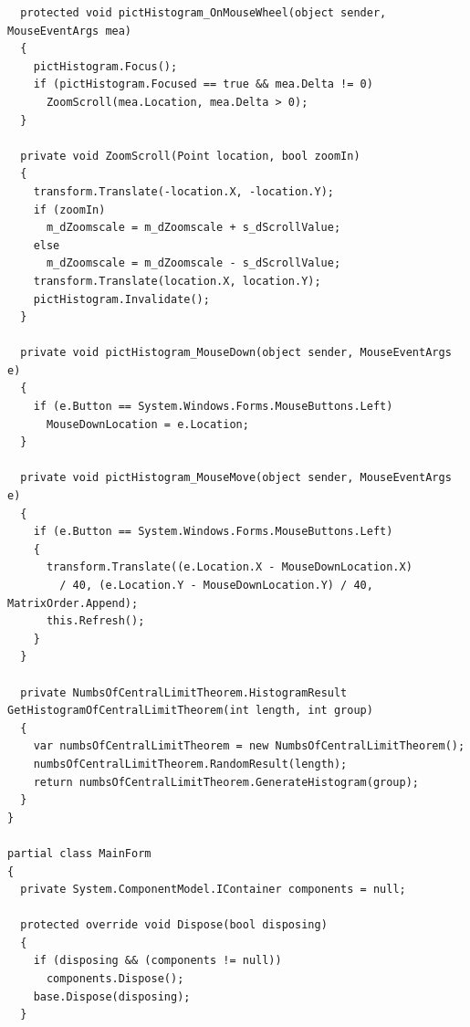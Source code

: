 \begin{apendicesenv}
\begin{lstlisting}
  protected void pictHistogram_OnMouseWheel(object sender, MouseEventArgs mea)
  {
    pictHistogram.Focus();
    if (pictHistogram.Focused == true && mea.Delta != 0)
      ZoomScroll(mea.Location, mea.Delta > 0);
  }

  private void ZoomScroll(Point location, bool zoomIn)
  {
    transform.Translate(-location.X, -location.Y);
    if (zoomIn)
      m_dZoomscale = m_dZoomscale + s_dScrollValue;
    else
      m_dZoomscale = m_dZoomscale - s_dScrollValue;
    transform.Translate(location.X, location.Y);
    pictHistogram.Invalidate();
  }

  private void pictHistogram_MouseDown(object sender, MouseEventArgs e)
  {
    if (e.Button == System.Windows.Forms.MouseButtons.Left)
      MouseDownLocation = e.Location;
  }

  private void pictHistogram_MouseMove(object sender, MouseEventArgs e)
  {
    if (e.Button == System.Windows.Forms.MouseButtons.Left)
    {
      transform.Translate((e.Location.X - MouseDownLocation.X)
        / 40, (e.Location.Y - MouseDownLocation.Y) / 40, MatrixOrder.Append);
      this.Refresh();
    }
  }

  private NumbsOfCentralLimitTheorem.HistogramResult GetHistogramOfCentralLimitTheorem(int length, int group)
  {
    var numbsOfCentralLimitTheorem = new NumbsOfCentralLimitTheorem();
    numbsOfCentralLimitTheorem.RandomResult(length);
    return numbsOfCentralLimitTheorem.GenerateHistogram(group);
  }
}

partial class MainForm
{
  private System.ComponentModel.IContainer components = null;

  protected override void Dispose(bool disposing)
  {
    if (disposing && (components != null))
      components.Dispose();
    base.Dispose(disposing);
  }


\end{lstlisting}
\end{apendicesenv}
